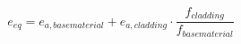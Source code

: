 \documentclass[12pt]{article}
\begin{document}
\begin{displaymath}
e_{eq} = e_{a,base material} + e_{a,cladding} \cdot \frac {f_{cladding}} {f_{base material}}
\end{displaymath}
\end{document}
